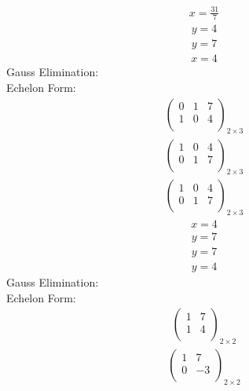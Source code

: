 \documentclass{article}
\begin{document}
\begin{align*}
x=\frac{31}{7}\end{align*}
\begin{align*}
y=4\end{align*}
\begin{align*}
y=7\end{align*}
\begin{align*}
x=4\end{align*}
Gauss Elimination:\\
Echelon Form:\\
\begin{align*}
\left(
\begin{array}{cc|c}
0 & 1 & 7\\
1 & 0 & 4\\
\end{array}
\right)_{2\times 3}
\end{align*}
\begin{align*}
\left(
\begin{array}{cc|c}
1 & 0 & 4\\
0 & 1 & 7\\
\end{array}
\right)_{2\times 3}
\end{align*}
\begin{align*}
\left(
\begin{array}{cc|c}
1 & 0 & 4\\
0 & 1 & 7\\
\end{array}
\right)_{2\times 3}
\end{align*}
\begin{align*}
x=4\end{align*}
\begin{align*}
y=7\end{align*}
\begin{align*}
y=7\end{align*}
\begin{align*}
y=4\end{align*}
Gauss Elimination:\\
Echelon Form:\\
\begin{align*}
\left(
\begin{array}{c|c}
1 & 7\\
1 & 4\\
\end{array}
\right)_{2\times 2}
\end{align*}
\begin{align*}
\left(
\begin{array}{c|c}
1 & 7\\
0 & -3\\
\end{array}
\right)_{2\times 2}
\end{align*}
\end{document}
